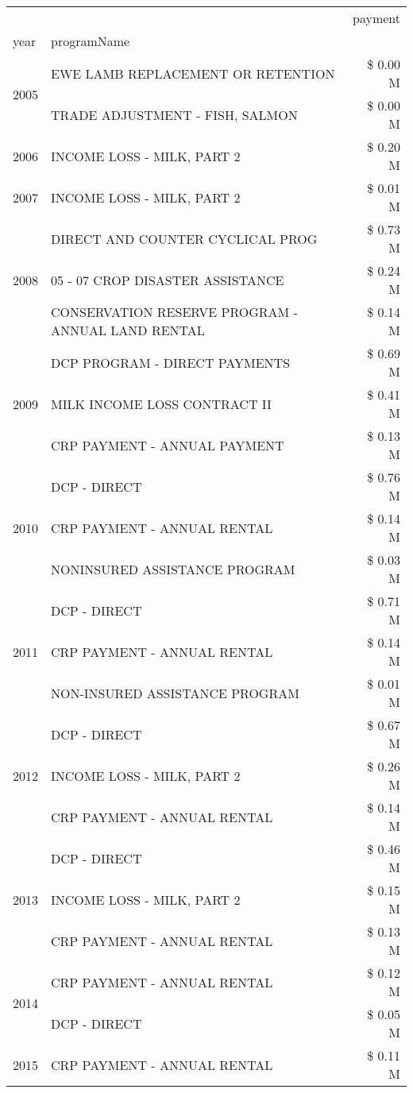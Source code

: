 \begin{tabular}{llr}
\toprule
 &  & payment \\
year & programName &  \\
\midrule
\multirow[t]{2}{*}{2005} & EWE LAMB REPLACEMENT OR RETENTION & \$ 0.00 M \\
 & TRADE ADJUSTMENT - FISH, SALMON & \$ 0.00 M \\
\cline{1-3}
2006 & INCOME LOSS - MILK, PART 2 & \$ 0.20 M \\
\cline{1-3}
2007 & INCOME LOSS - MILK, PART 2 & \$ 0.01 M \\
\cline{1-3}
\multirow[t]{3}{*}{2008} & DIRECT AND COUNTER CYCLICAL PROG & \$ 0.73 M \\
 & 05 - 07 CROP DISASTER ASSISTANCE & \$ 0.24 M \\
 & CONSERVATION RESERVE PROGRAM - ANNUAL LAND RENTAL & \$ 0.14 M \\
\cline{1-3}
\multirow[t]{3}{*}{2009} & DCP PROGRAM - DIRECT PAYMENTS & \$ 0.69 M \\
 & MILK INCOME LOSS CONTRACT II & \$ 0.41 M \\
 & CRP PAYMENT - ANNUAL PAYMENT & \$ 0.13 M \\
\cline{1-3}
\multirow[t]{3}{*}{2010} & DCP - DIRECT & \$ 0.76 M \\
 & CRP PAYMENT - ANNUAL RENTAL & \$ 0.14 M \\
 & NONINSURED ASSISTANCE PROGRAM & \$ 0.03 M \\
\cline{1-3}
\multirow[t]{3}{*}{2011} & DCP - DIRECT & \$ 0.71 M \\
 & CRP PAYMENT - ANNUAL RENTAL & \$ 0.14 M \\
 & NON-INSURED ASSISTANCE PROGRAM & \$ 0.01 M \\
\cline{1-3}
\multirow[t]{3}{*}{2012} & DCP - DIRECT & \$ 0.67 M \\
 & INCOME LOSS - MILK, PART 2 & \$ 0.26 M \\
 & CRP PAYMENT - ANNUAL RENTAL & \$ 0.14 M \\
\cline{1-3}
\multirow[t]{3}{*}{2013} & DCP - DIRECT & \$ 0.46 M \\
 & INCOME LOSS - MILK, PART 2 & \$ 0.15 M \\
 & CRP PAYMENT - ANNUAL RENTAL & \$ 0.13 M \\
\cline{1-3}
\multirow[t]{2}{*}{2014} & CRP PAYMENT - ANNUAL RENTAL & \$ 0.12 M \\
 & DCP - DIRECT & \$ 0.05 M \\
\cline{1-3}
\multirow[t]{3}{*}{2015} & CRP PAYMENT - ANNUAL RENTAL & \$ 0.11 M \\

\end{tabular}
